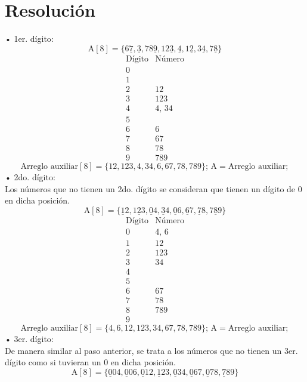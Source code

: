 \documentclass[letterpaper, 12pt]{article}
\begin{document}
    \section{Resolución}
    \justify
    • 1er. dígito:
    \[\text{A}[8]=\{6\underline{7},\underline{3},78\underline{9},12\underline{3},\underline{4},1\underline{2},3\underline{4},7\underline{8}\}\]
    \[\begin{matrix}
        \text{Dígito}&\text{Número}\\
        0&\\
        1&\\
        2&12\\
        3&123\\
        4&4,\,34\\
        5&\\
        6&6\\
        7&67\\
        8&78\\
        9&789
    \end{matrix}\]
    \[\text{Arreglo auxiliar}[8]=\{12,123,4,34,6,67,78,789\};\,\text{A}=\text{Arreglo auxiliar};\]
    • 2do. dígito:\\
    Los números que no tienen un 2do. dígito se consideran que tienen un dígito de 0 en dicha posición.
    \[\text{A}[8]=\{\underline{1}2,1\underline{2}3,\underline{0}4,\underline{3}4,\underline{0}6,\underline{6}7,\underline{7}8,7\underline{8}9\}\]
    \[\begin{matrix}
        \text{Dígito}&\text{Número}\\
        0&4,\,6\\
        1&12\\
        2&123\\
        3&34\\
        4&\\
        5&\\
        6&67\\
        7&78\\
        8&789\\
        9&
    \end{matrix}\]
    \[\text{Arreglo auxiliar}[8]=\{4,6,12,123,34,67,78,789\};\,\text{A}=\text{Arreglo auxiliar};\]
    • 3er. dígito:\\
    De manera similar al paso anterior, se trata a los números que no tienen un 3er. dígito como si tuvieran un 0 en dicha posición.
    \[\text{A}[8]=\{\underline{0}04,\underline{0}06,\underline{0}12,\underline{1}23,\underline{0}34,\underline{0}67,\underline{0}78,\underline{7}89\}\]
\end{document}
